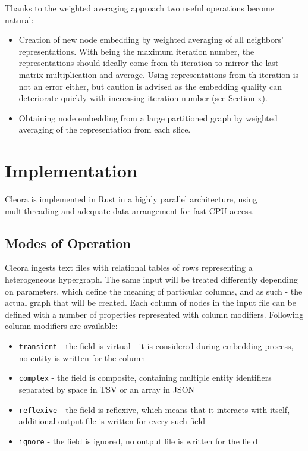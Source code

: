 \documentclass{IEEEtran}
\begin{document}
Thanks to the weighted averaging approach two useful operations become natural: 
\begin{itemize}
    \item Creation of new node embedding by weighted averaging of all neighbors' representations. With  being the maximum iteration number, the representations should ideally come from th iteration to mirror the last matrix multiplication and average. Using representations from th iteration is not an error either, but caution is advised as the embedding quality can deteriorate quickly with increasing iteration number (see Section x).
    \item Obtaining node embedding from a large partitioned graph by weighted averaging of the representation from each slice.
\end{itemize}
 
 
\section{Implementation}

Cleora is implemented in Rust in a highly parallel architecture, using multithreading and adequate data arrangement for fast CPU access. 

\subsection{Modes of Operation}

Cleora ingests text files with relational tables of rows representing a heterogeneous hypergraph. The same input will be treated differently depending on parameters, which define the meaning of particular columns, and as such - the actual graph that will be created. Each column of nodes in the input file can be defined with a number of properties represented with column modifiers. Following column modifiers are available:
\begin{itemize}
    \item \texttt{transient} - the field is virtual - it is considered during embedding process, no entity is written for the column
    \item \texttt{complex} - the field is composite, containing multiple entity identifiers separated by space in TSV or an array in JSON
    \item \texttt{reflexive} - the field is reflexive, which means that it interacts with itself, additional output file is written for every such field
    \item \texttt{ignore} - the field is ignored, no output file is written for the field
\end{itemize}
\end{document}
